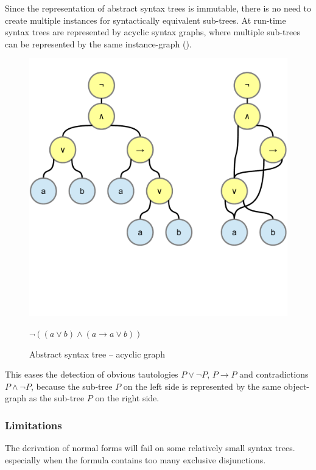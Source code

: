 Since the representation of abstract syntax trees is immutable,
there is no need to create multiple instances for syntactically equivalent sub-trees. 
At run-time syntax trees are represented by acyclic syntax graphs, 
where multiple sub-trees can be represented by the same instance-graph
().

\begin{figure}[htb]
\begin{center}
\includegraphics[scale=0.5,trim=0cm 5.4cm 0cm 1cm,clip=true]{diagrams/AcyclicSyntaxGraph.pdf}
\caption{Abstract syntax tree – acyclic graph }{$\neg( (a\vee b) \wedge (a \rightarrow a\vee b))$}
\label{fig:AST+ASG}
\end{center}
\end{figure}

This eases the detection of obvious tautologies $P \vee \neg P$, $P \rightarrow P$ and contradictions $P \wedge \neg P$,
because the sub-tree $P$ on the left side is represented by the same object-graph as the sub-tree $P$ on the right side.

\subsubsection{Limitations}

The derivation of normal forms will fail on some relatively small syntax trees.
especially when the formula contains too many exclusive disjunctions.

